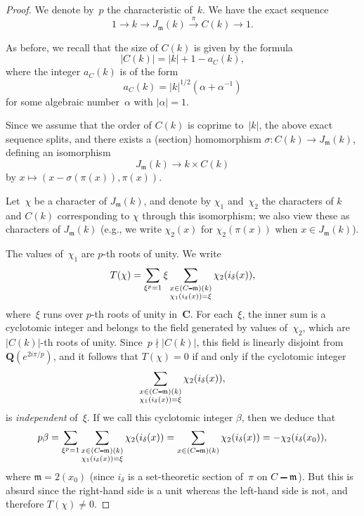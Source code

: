 \documentclass[12pt]{amsart}
\numberwithin{equation}{section}
\def\setminus{\mathchoice
    {\mathbin{\vrule height .62ex width 1.61ex depth -.38ex}}%
    {\mathbin{\vrule height .62ex width 1.61ex depth -.38ex}}%
    {\mathbin{\vrule height .50ex width 0.85ex depth -.28ex}}%
    {\mathbin{\vrule height .20ex width 0.570ex depth -.24ex}}%
}
\newcommand{\Cc}{\mathbf{C}}
\newcommand{\Qq}{\mathbf{Q}}
\newcommand{\mfm}{\mathfrak{m}}
\newcommand{\lra}{\longrightarrow}
\newcommand{\fleche}[1]{\stackrel{#1}{\lra}}
\theoremstyle{plain}
\theoremstyle{remark}
\theoremstyle{definition}
\begin{document}
\begin{proof}
  We denote by~$p$ the characteristic of~$k$. We have the exact sequence
  \[
    1\to k\to J_{\mfm}(k)\fleche{\pi} C(k)\to 1.
  \]

  As before, we recall that the size of $C(k)$ is given by the formula
  \[
    |C(k)|=|k|+1-a_C(k),
  \]
  where the integer $a_C(k)$ is of the form
  \[
    a_C(k)=|k|^{1/2}(\alpha+\alpha^{-1})
  \]
  for some algebraic number~$\alpha$ with $|\alpha|=1$.
  
  Since we assume that the order of $C(k)$ is coprime to~$|k|$, the
  above exact sequence splits, and there exists a (section) homomorphism
  $\sigma\colon C(k)\to J_{\mfm}(k)$, defining an isomorphism
  \[
    J_{\mfm}(k)\to k\times C(k)
  \]
  by $x\mapsto (x-\sigma(\pi(x)),\pi(x))$.

  Let~$\chi$ be a character of $J_{\mfm}(k)$, and denote by $\chi_1$
  and~$\chi_2$ the characters of $k$ and $C(k)$ corresponding to $\chi$
  through this isomorphism; we also view these as characters of
  $J_{\mfm}(k)$ (e.g., we write $\chi_2(x)$ for $\chi_2(\pi(x))$ when
  $x\in J_{\mfm}(k)$).

  The values of~$\chi_1$ are $p$-th roots of unity. We write
  \[
    T(\chi)=\sum_{\xi^p=1}\xi\sum_{\substack{x\in (C\setminus
        \mfm)(k)\\\chi_1(i_{\delta}(x))=\xi}}\chi_2(i_{\delta}(x)),
  \]
  where~$\xi$ runs over $p$-th roots of unity in~$\Cc$. For each~$\xi$,
  the inner sum is a cyclotomic integer and belongs to the field
  generated by values of~$\chi_2$, which are $|C(k)|$-th roots of unity.
  Since~$p\nmid |C(k)|$, this field is linearly disjoint from
  $\Qq(e^{2i\pi/p})$, and it follows that $T(\chi)=0$ if and only if the
  cyclotomic integer
  \[
    \sum_{\substack{x\in (C\setminus
        \mfm)(k)\\\chi_1(i_{\delta}(x))=\xi}}\chi_2(i_{\delta}(x)),
  \]
  is \emph{independent} of~$\xi$. If we call this cyclotomic integer
  $\beta$, then we deduce that
  \[
    p\beta=\sum_{\xi^p=1} \sum_{\substack{x\in (C\setminus
        \mfm)(k)\\\chi_1(i_{\delta}(x))=\xi}}\chi_2(i_{\delta}(x))=
    \sum_{x\in (C\setminus
      \mfm)(k)}\chi_2(i_{\delta}(x))=-\chi_2(i_{\delta}(x_0)),
  \]
  where $\mfm=2(x_0)$ (since $i_{\delta}$ is a set-theoretic section
  of~$\pi$ on $C\setminus \mfm$). But this is absurd since the
  right-hand side is a unit whereas the left-hand side is not, and
  therefore $T(\chi)\not=0$.
\end{proof}
\end{document}
